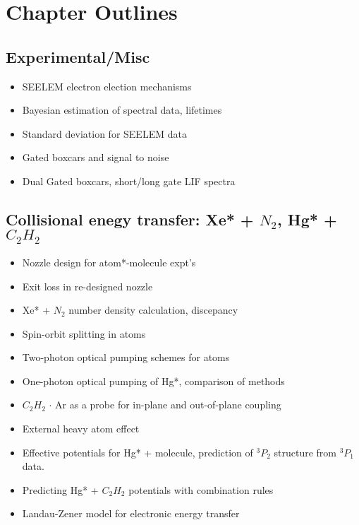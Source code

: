 \documentclass[12pt]{article}
\begin{document}
\section*{Chapter Outlines}

\subsection{Experimental/Misc}
\begin{itemize}
\item SEELEM electron election mechanisms
\item Bayesian estimation of spectral data, lifetimes
\item Standard deviation for SEELEM data
\item Gated boxcars and signal to noise
\item Dual Gated boxcars, short/long gate LIF spectra 
\end{itemize}

\subsection{Collisional enegy transfer: Xe* + $N_2$, Hg* + $C_2H_2$}
\begin{itemize}
\item Nozzle design for atom*-molecule expt's
\item Exit loss in re-designed nozzle
\item Xe* + $N_2$ number density calculation, discepancy
\item Spin-orbit splitting in atoms
\item Two-photon optical pumping schemes for atoms
\item One-photon optical pumping of Hg*, comparison of methods
\item $C_2H_2$ $\cdot$ Ar as a probe for in-plane and out-of-plane
  coupling
\item External heavy atom effect
\item Effective potentials for Hg* + molecule, prediction of $^3P_2$
  structure from $^3P_1$ data.
\item Predicting Hg* + $C_2H_2$ potentials with combination rules
\item Landau-Zener model for electronic energy transfer
\end{itemize}
\end{document}
